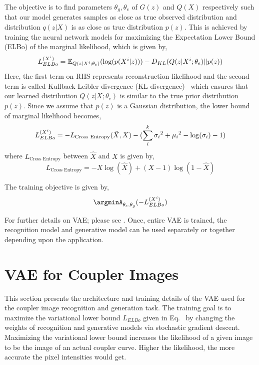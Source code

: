 The objective is to find parameters $\theta_g, \theta_e $ of $G(z)$ and $Q(X)$ respectively such that our model generates samples as close as true observed distribution and distribution $q(z|X)$ is as close as true distribution $p(z)$.
This is achieved by training the neural network models for maximizing the Expectation Lower Bound (ELBo) of the marginal likelihood, which is given by,
\begin{equation}\label{elbo_loss}
  L_{ELBo}^{(X^i)} = \mathbb{E}_{Q(z|X^{i}; \theta_e)}(\log(p(X^{i}|z))) - D_{KL}(Q(z|X^{i}; \theta_e)||p(z))  \\
\end{equation}
Here, the first term on RHS represents reconstruction likelihood and the second term is called Kullback-Leibler divergence (KL divergence)~\cite{kullback1951} which ensures that our learned distribution $Q(z|X;\theta_e)$ is similar to the true prior distribution $p(z)$.
Since we assume that $p(z)$ is a Gaussian distribution, the lower bound of marginal likelihood becomes,
\begin{equation}
  L_{ELBo}^{(X^i)} = - L_{\text{Cross Entropy}}(\hat{X}, X) - (\sum_i^{k} {\sigma_i}^2 + {\mu_i}^2 - \log(\sigma_i) - 1) \\
\end{equation}
where $L_{\text{Cross Entropy}}$ between $\hat{X}$ and $X$ is given by,
\begin{equation}
    L_{\text{Cross Entropy}} = -X\log(\hat{X}) + (X - 1)\log(1 -\hat{X})
\end{equation}

The training objective is given by,
\begin{equation}
 \argminA_{\theta_e, \theta_g} ( - L_{ELBo}^{(X^i)})
\end{equation}

For further details on VAE; please see \cite{Kingma2014AutoEncodingVB}.
Once, entire VAE is trained, the recognition model and generative model can be used separately or together depending upon the application.

\section{VAE for Coupler Images}\label{sec_vae_for_image}
This section presents the architecture and training details of the VAE used for the coupler image recognition and generation task. 
The training goal is to maximize the variational lower bound $L_{ELBo}$ given in Eq.~ by changing the weights of recognition and generative models via stochastic gradient descent.
Maximizing the variational lower bound increases the likelihood of a given image to be the image of an actual coupler curve. Higher the likelihood, the more accurate the pixel intensities would get. 

